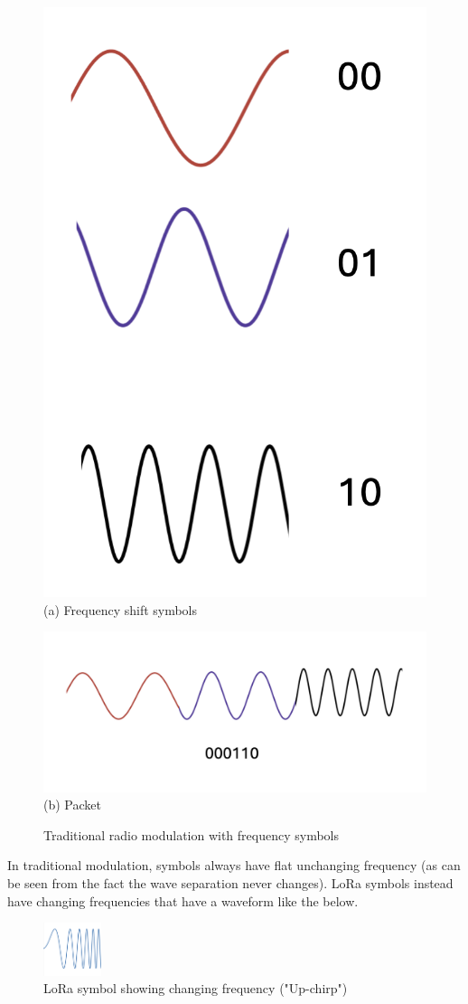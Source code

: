 \begin{figure}[H]
  \centering
  \begin{minipage}{0.48\textwidth}
    \centering
    \includegraphics[width=0.4\linewidth]{contents/part-1/fig1/frequencysymbols.png}
    \\[4pt]
    {\small (a) Frequency shift symbols} \end{minipage}\hfill
  \begin{minipage}{0.48\textwidth}
    \centering
    \includegraphics[width=1\linewidth]{contents/part-1/fig1/packet.png}
    \\[4pt]
    {\small (b) Packet}
  \end{minipage}
  \caption{ Traditional radio modulation with frequency symbols}
  \label{fig:freq-and-packet}
\end{figure}

In traditional modulation, symbols always have flat unchanging frequency (as can
be seen from the fact the wave separation never changes). LoRa symbols instead
have changing frequencies that have a waveform like the below.

\begin{figure}[H]
    \centering
    \includegraphics[width=0.15\textwidth]{contents/part-1/fig1/lorawavelength.png}
    \caption{LoRa symbol showing changing frequency ("Up-chirp")}
    \label{fig:lora-wave}
\end{figure}

